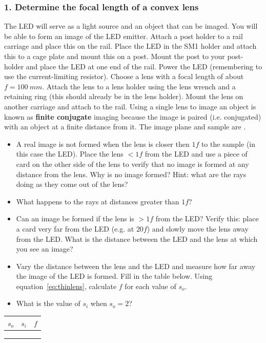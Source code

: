 \documentclass[a4paper]{report}
\begin{document}
\subsubsection{1. Determine the focal length of a convex lens }
The LED will serve as a light source and an object that can be imaged. 
You will be able to form an image of the LED emitter.
Attach a post holder to a rail carriage and place this on the rail. 
Place the LED in the SM1 holder and attach this to a cage plate and mount this on a post. 
Mount the post to your post-holder and place the LED at one end of the rail.
Power the LED (remembering to use the current-limiting resistor). 
Choose a lens with a focal length of about $f=100~mm$. 
Attach the lens to a lens holder using the lens wrench and a retaining ring (this should already be in the lens holder).
Mount the lens on another carriage and attach to the rail. 
Using a single lens to image an object is known as \textbf{finite conjugate} imaging because the image is paired (i.e. conjugated) with an object at a finite distance from it.
The image plane and sample are .



\begin{itemize}
\item A real image is not formed when the lens is closer then $1f$ to the sample (in this case the LED). 
Place the lens $<1f$ from the LED and use a piece of card on the other side of the lens to verify that no image is formed at any distance from the lens.
Why is no image formed? Hint: what are the rays doing as they come out of the lens? 
\item What happens to the rays at distances greater than $1f$? 
\item Can an image be formed if the lens is $>1f$ from the LED? 
Verify this: place a card very far from the LED (e.g. at $20f$) and slowly move the lens away from the LED. 
What is the distance between the LED and the lens at which you see an image? 
\item Vary the distance between the lens and the LED and measure how far away the image of the LED is formed. 
Fill in the table below. 
Using equation~\ref{eq:thinlens}, calculate $f$ for each value of $s_o$.
\item What is the value of $s_i$ when $s_o=2$?
\end{itemize}

\vspace{2em}
\begin{tabular}{| p{1cm} | p{1cm} | p{1cm} |}
\hline
 $s_o$  &  $s_i$  &  $f$  \\
\hline
\hline
 & & \\ \hline
 & & \\ \hline
 & & \\ \hline
\end{tabular}
\end{document}
